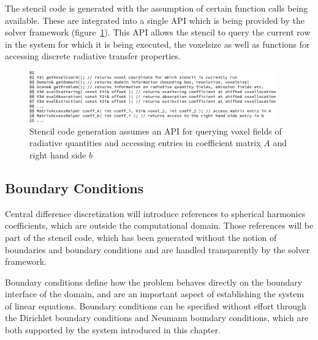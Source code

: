 The stencil code is generated with the assumption of certain function calls being available. These are integrated into a single API which is being provided by the solver framework (figure~\ref{fig:pn_discretization_codegen_stencilAPI}). This API allows the stencil to query the current row in the system for which it is being executed, the voxelsize as well as functions for accessing discrete radiative transfer properties.
\begin{figure}[h]
\centering
\includegraphics[width=0.95\textwidth]{04_pn_method/figures/fig_stencil_api.pdf}
\caption{Stencil code generation assumes an API for querying voxel fields of radiative quantities and accessing entries in coefficient matrix $A$ and right hand side $b$}
\label{fig:pn_discretization_codegen_stencilAPI}
\end{figure}


\subsection{Boundary Conditions}
\label{sec:pn_bc}

Central difference discretization will introduce references to spherical harmonics coefficients, which are outside the computational domain. Those references will be part of the stencil code, which has been generated without the notion of boundaries and boundary conditions and are handled transparently by the solver framework.

Boundary conditions define how the problem behaves directly on the boundary interface of the domain, and are an important aspect of establishing the system of linear equations. Boundary conditions can be specified without effort through the Dirichlet boundary conditions and Neumann boundary conditions, which are both supported by the system introduced in this chapter.

